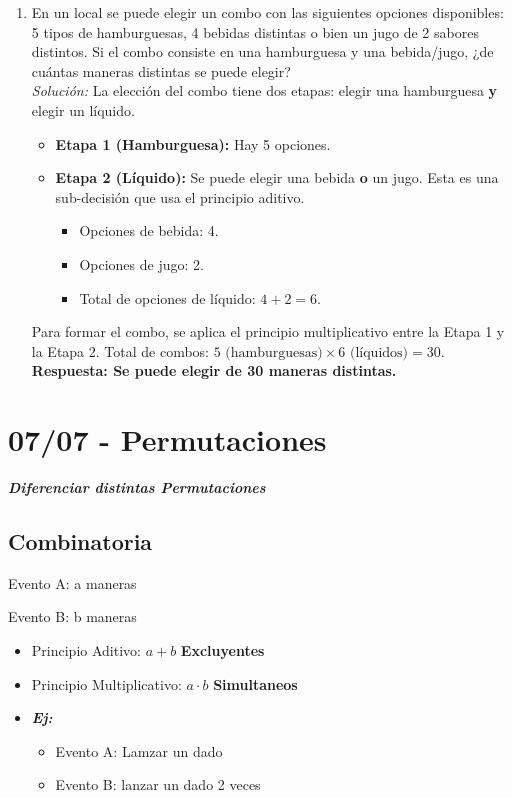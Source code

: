 \documentclass[12pt, letterpaper]{article}
\begin{document}
\begin{enumerate}
    \item En un local se puede elegir un combo con las siguientes opciones disponibles: 5 tipos de hamburguesas, 4 bebidas distintas o bien un jugo de 2 sabores distintos. Si el combo consiste en una hamburguesa y una bebida/jugo, ¿de cuántas maneras distintas se puede elegir? \\
    \textit{Solución:}
    La elección del combo tiene dos etapas: elegir una hamburguesa \textbf{y} elegir un líquido.
    \begin{itemize}
        \item \textbf{Etapa 1 (Hamburguesa):} Hay 5 opciones.
        \item \textbf{Etapa 2 (Líquido):} Se puede elegir una bebida \textbf{o} un jugo. Esta es una sub-decisión que usa el principio aditivo.
        \begin{itemize}
            \item Opciones de bebida: 4.
            \item Opciones de jugo: 2.
            \item Total de opciones de líquido: $4 + 2 = 6$.
        \end{itemize}
    \end{itemize}
    Para formar el combo, se aplica el principio multiplicativo entre la Etapa 1 y la Etapa 2.
    Total de combos: $5 \text{ (hamburguesas)} \times 6 \text{ (líquidos)} = 30$. \\
    \textbf{Respuesta: Se puede elegir de 30 maneras distintas.}
\end{enumerate}
\newpage


\section{07/07 - Permutaciones}
\textbf{\textit{\large{Diferenciar distintas Permutaciones}}}

\subsection{Combinatoria}
Evento A: a maneras 

Evento B: b maneras

\begin{itemize}
    \item Principio Aditivo: $a + b$ \textbf{Excluyentes}
    \item Principio Multiplicativo: $a \cdot b$ \textbf{Simultaneos} 
    \item \textbf{\textit{Ej:}}
    \begin{itemize}
        \item Evento A: Lamzar un dado
        \item Evento B: lanzar un dado 2 veces
    \end{itemize}
\end{itemize}
\end{document}
